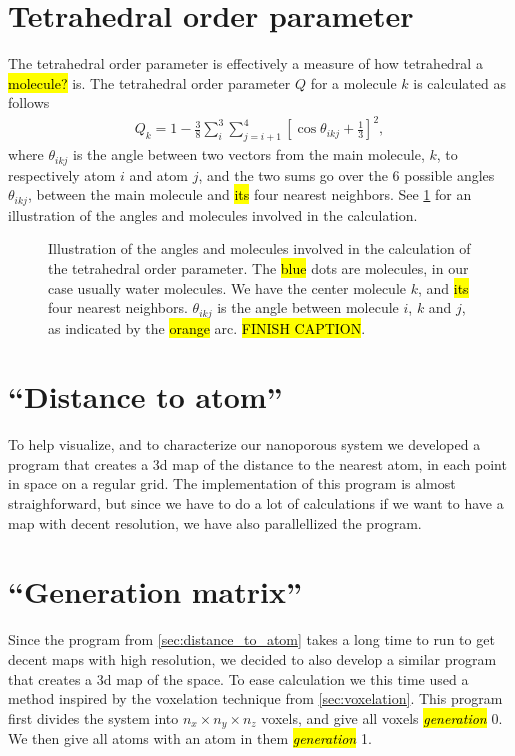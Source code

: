 
\section{Tetrahedral order parameter}
The tetrahedral order parameter\cite{errington2001relationship} is effectively a measure of how tetrahedral a \hl{molecule?} is. The tetrahedral order parameter $Q$ for a molecule $k$ is calculated as follows
\begin{align*}
    Q_k = 1 - \frac{3}{8}\sum_i^3\sum_{j=i+1}^4 \left[ \cos \theta_{ikj} + \frac{1}{3} \right]^2,
\end{align*}
where $\theta_{ikj}$ is the angle between two vectors from the main molecule, $k$, to respectively atom $i$ and atom $j$, and the two sums go over the 6 possible angles $\theta_{ikj}$, between the main molecule and \hl{its} four nearest neighbors. See \cref{fig:top_tetrahedra} for an illustration of the angles and molecules involved in the calculation.
%
\begin{figure}[htpb]%
    \centering%
    \caption{%
        Illustration of the angles and molecules involved in the calculation of the tetrahedral order parameter. The \hl{blue} dots are molecules, in our case usually water molecules. We have the center molecule $k$, and \hl{its} four nearest neighbors. $\theta_{ikj}$ is the angle between molecule $i$, $k$ and $j$, as indicated by the \hl{orange} arc. \hl{FINISH CAPTION}. %
        \label{fig:top_tetrahedra}%
    }%
\end{figure}%

\section{``Distance to atom''\label{sec:distance_to_atom}}
To help visualize, and to characterize our nanoporous system we developed a program that creates a 3d map of the distance to the nearest atom, in each point in space on a regular grid. The implementation of this program is almost straighforward, but since we have to do a lot of calculations if we want to have a map with decent resolution, we have also parallellized the program. 

\section{``Generation matrix''}
Since the program from \cref{sec:distance_to_atom} takes a long time to run to get decent maps with high resolution, we decided to also develop a similar program that creates a 3d map of the space. To ease calculation we this time used a method inspired by the voxelation technique from \cref{sec:voxelation}. This program first divides the system into $n_x\times n_y\times n_z$ voxels, and give all voxels \hl{\emph{generation}} 0. We then give all atoms with an atom in them \hl{\emph{generation}} 1. 

